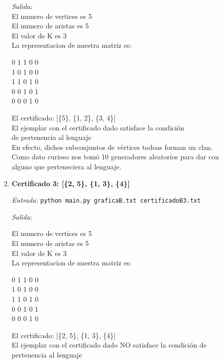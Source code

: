 \documentclass[12pt,letterpaper]{article}
\begin{document}
\begin{itemize}
\begin{itemize}
\begin{enumerate}
            \textit{Salida:}\\
            El numero de vertices es 5\\
            El numero de aristas es 5\\
            El valor de K es 3\\
            La representacion de nuestra matriz es:
            \begin{center}
            0 1 1 0 0\\
            1 0 1 0 0\\
            1 1 0 1 0\\
            0 0 1 0 1\\
            0 0 0 1 0\\
            \end{center}
            El certificado: [\{5\}, \{1, 2\}, \{3, 4\}]\\
            El ejemplar con el certificado dado satisface la condición\\
            de pertenencia al lenguaje\\
            
            En efecto, dichos subconjuntos de vértices todoas forman un clan.
            Como dato curioso nos tomó 10 generadores aleatorios para dar con alguno que perteneciera al lenguaje.
            
            \item \textbf{Certificado 3: [\{2, 5\}, \{1, 3\}, \{4\}]}
            
            \textit{Entrada:}
            \texttt{python main.py graficaB.txt certificadoB3.txt}
            
            \textit{Salida:}

            El numero de vertices es 5 \\ 
            El numero de aristas es 5 \\ 
            El valor de K es 3 \\ 
            La representacion de nuestra matriz es:
            \begin{center}
                0 1 1 0 0 \\ 
                1 0 1 0 0 \\ 
                1 1 0 1 0 \\ 
                0 0 1 0 1 \\ 
                0 0 0 1 0 \\ 
            \end{center}
            El certificado: [\{2, 5\}, \{1, 3\}, \{4\}] \\ 
            El ejemplar con el certificado dado NO satisface la condición
            de pertenencia al lenguaje
            

\end{enumerate}
\end{itemize}
\end{itemize}
\end{document}

